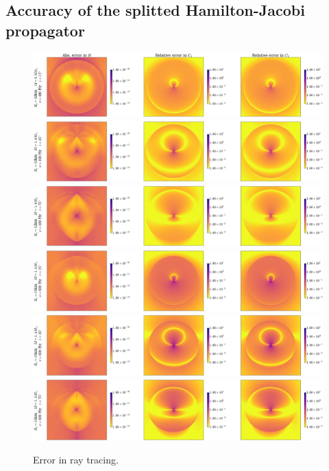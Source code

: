 \documentclass[iop, usenatbib]{emulateapj}
\begin{document}
\subsection{Accuracy of the splitted Hamilton-Jacobi propagator}

\begin{figure}
\centering
\includegraphics[width=16cm]{figs/popiha/fig_casual_15.pdf}
\includegraphics[width=16cm]{figs/popiha/fig_casual_45.pdf}
\includegraphics[width=16cm]{figs/popiha/fig_casual_75.pdf}
\includegraphics[width=16cm]{figs/popiha/fig_extreme_15.pdf}
\includegraphics[width=16cm]{figs/popiha/fig_extreme_45.pdf}
\includegraphics[width=16cm]{figs/popiha/fig_extreme_75.pdf}
\caption{\label{fig:H_C1_C2}
  Error in ray tracing.
  }
\end{figure}
\end{document}
